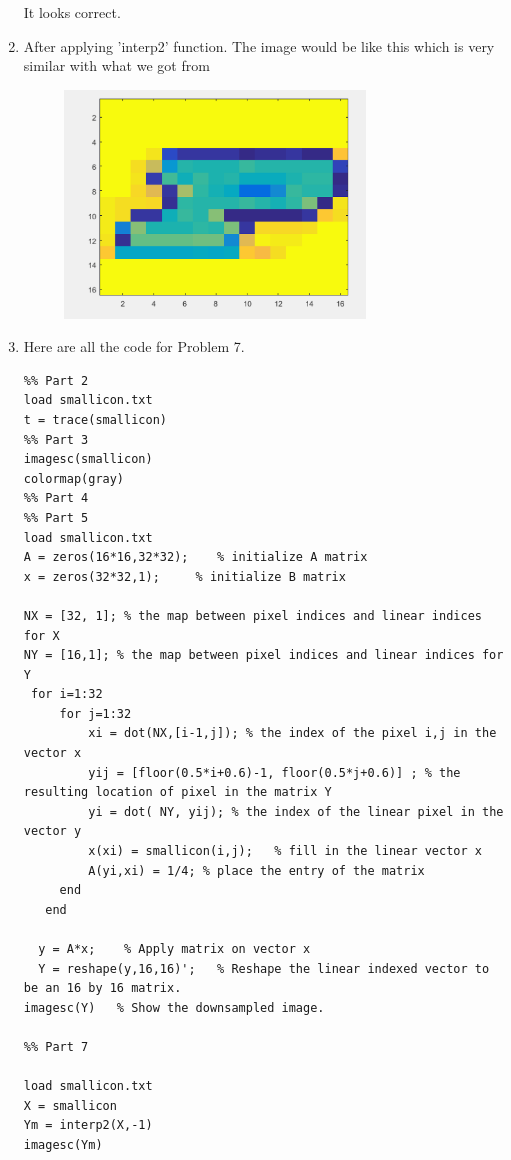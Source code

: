 \documentclass{article}
\begin{document}
\begin{enumerate}
\begin{figure} [h]
\end{figure}
It looks correct. 

\item After applying 'interp2' function.  The image would be like this which is very similar with what we got from 
\begin{figure} [h]
\includegraphics[width=8cm]{interp2}

\end{figure}

\item Here are all the code for Problem 7. 
\begin{lstlisting}
%% Part 2
load smallicon.txt
t = trace(smallicon)
%% Part 3 
imagesc(smallicon)
colormap(gray)
%% Part 4 
%% Part 5
load smallicon.txt
A = zeros(16*16,32*32);    % initialize A matrix
x = zeros(32*32,1);		% initialize B matrix

NX = [32, 1]; % the map between pixel indices and linear indices for X
NY = [16,1]; % the map between pixel indices and linear indices for Y
 for i=1:32
     for j=1:32    
         xi = dot(NX,[i-1,j]); % the index of the pixel i,j in the vector x
         yij = [floor(0.5*i+0.6)-1, floor(0.5*j+0.6)] ; % the resulting location of pixel in the matrix Y
         yi = dot( NY, yij); % the index of the linear pixel in the vector y
         x(xi) = smallicon(i,j);   % fill in the linear vector x
         A(yi,xi) = 1/4; % place the entry of the matrix
     end
   end

  y = A*x;    % Apply matrix on vector x
  Y = reshape(y,16,16)';   % Reshape the linear indexed vector to be an 16 by 16 matrix. 
imagesc(Y)   % Show the downsampled image.  

%% Part 7 

load smallicon.txt
X = smallicon
Ym = interp2(X,-1)
imagesc(Ym) 
\end{lstlisting}

\end{enumerate} 
\end{document}
